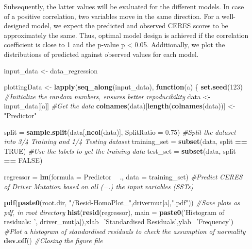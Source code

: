 \documentclass[]{article}
\newenvironment{Shaded}{\begin{snugshade}}{\end{snugshade}}
\newcommand{\CommentTok}[1]{\textcolor[rgb]{0.56,0.35,0.01}{\textit{#1}}}
\newcommand{\ControlFlowTok}[1]{\textcolor[rgb]{0.13,0.29,0.53}{\textbf{#1}}}
\newcommand{\DataTypeTok}[1]{\textcolor[rgb]{0.13,0.29,0.53}{#1}}
\newcommand{\DecValTok}[1]{\textcolor[rgb]{0.00,0.00,0.81}{#1}}
\newcommand{\FloatTok}[1]{\textcolor[rgb]{0.00,0.00,0.81}{#1}}
\newcommand{\KeywordTok}[1]{\textcolor[rgb]{0.13,0.29,0.53}{\textbf{#1}}}
\newcommand{\NormalTok}[1]{#1}
\newcommand{\OperatorTok}[1]{\textcolor[rgb]{0.81,0.36,0.00}{\textbf{#1}}}
\newcommand{\OtherTok}[1]{\textcolor[rgb]{0.56,0.35,0.01}{#1}}
\newcommand{\StringTok}[1]{\textcolor[rgb]{0.31,0.60,0.02}{#1}}
\begin{document}
Subsequently, the latter values will be evaluated for the different
models. In case of a positive correlation, two variables move in the
same direction. For a well-designed model, we expect the predicted and
observed CERES scores to be approximately the same. Thus, optimal model
design is achieved if the correlation coefficient is close to 1 and the
p-value p \textless{} 0.05. Additionally, we plot the distributions of
predicted against observed values for each model.

\begin{Shaded}
\begin{Highlighting}[]
\NormalTok{input_data <-}\StringTok{ }\NormalTok{data_regression}

\NormalTok{plottingData <-}\StringTok{ }\KeywordTok{lapply}\NormalTok{(}\KeywordTok{seq_along}\NormalTok{(input_data), }\ControlFlowTok{function}\NormalTok{(a) \{}
  \KeywordTok{set.seed}\NormalTok{(}\DecValTok{123}\NormalTok{) }\CommentTok{#Initialize the random numbers, ensures better repoducibility}
\NormalTok{  data <-}\StringTok{ }\NormalTok{input_data[[a]] }\CommentTok{#Get the data}
  \KeywordTok{colnames}\NormalTok{(data)[}\KeywordTok{length}\NormalTok{(}\KeywordTok{colnames}\NormalTok{(data))] <-}\StringTok{ "Predictor"}
  
\NormalTok{  split =}\StringTok{ }\KeywordTok{sample.split}\NormalTok{(data[,}\KeywordTok{ncol}\NormalTok{(data)], }\DataTypeTok{SplitRatio =} \FloatTok{0.75}\NormalTok{) }\CommentTok{#Split the dataset into 3/4 Training and 1/4 Testing dataset}
\NormalTok{  training_set =}\StringTok{ }\KeywordTok{subset}\NormalTok{(data, split }\OperatorTok{==}\StringTok{ }\OtherTok{TRUE}\NormalTok{) }\CommentTok{#Use the labels to get the training data}
\NormalTok{  test_set =}\StringTok{ }\KeywordTok{subset}\NormalTok{(data, split }\OperatorTok{==}\StringTok{ }\OtherTok{FALSE}\NormalTok{)}
  
\NormalTok{  regressor =}\StringTok{ }\KeywordTok{lm}\NormalTok{(}\DataTypeTok{formula =}\NormalTok{ Predictor }\OperatorTok{~}\StringTok{ }\NormalTok{., }
                 \DataTypeTok{data =}\NormalTok{ training_set)  }\CommentTok{#Predict CERES of Driver Mutation based on all (=.) the input variables (SSTs)}
  
  \KeywordTok{pdf}\NormalTok{(}\KeywordTok{paste0}\NormalTok{(root.dir, }\StringTok{"/Resid-HomoPlot_"}\NormalTok{,drivermut[a],}\StringTok{".pdf"}\NormalTok{)) }\CommentTok{#Save plots as pdf, in root directory}
  \KeywordTok{hist}\NormalTok{(}\KeywordTok{resid}\NormalTok{(regressor), }\DataTypeTok{main =} \KeywordTok{paste0}\NormalTok{(}\StringTok{'Histogram of residuals: '}\NormalTok{, driver_mut[a]),}\DataTypeTok{xlab=}\StringTok{'Standardised Residuals'}\NormalTok{,}\DataTypeTok{ylab=}\StringTok{'Frequency'}\NormalTok{) }\CommentTok{#Plot a histogram of standardised residuals to check the assumption of normality}
  \KeywordTok{dev.off}\NormalTok{() }\CommentTok{#Closing the figure file}
  

\end{Highlighting}
\end{Shaded}
\end{document}
